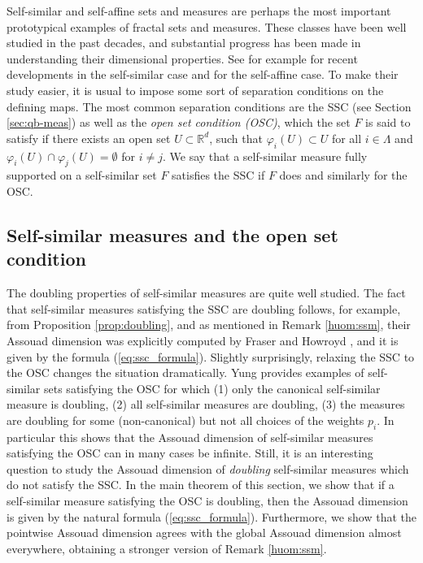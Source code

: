 \documentclass{PRM}
\newcommand{\field}[1]{\mathbb{#1}}
\newcommand{\R}{\field{R}}
\theoremstyle{plain}
\theoremstyle{definition}
\theoremstyle{remark}
\begin{document}
Self-similar and self-affine sets and measures are perhaps the most important prototypical examples of fractal sets and measures. These classes have been well studied in the past decades, and substantial progress has been made in understanding their dimensional properties. See for example \cite{Hoch} for recent developments in the self-similar case and \cite{BHR, HR} for the self-affine case. To make their study easier, it is usual to impose some sort of separation conditions on the defining maps. The most common separation conditions are the SSC (see Section \ref{sec:qb-meas}) as well as the \emph{open set condition (OSC)}, which the set $F$ is said to satisfy if there exists an open set $U\subset \R^d$, such that $\varphi_i(U)\subset U$ for all $i\in\Lambda$ and $\varphi_i(U)\cap \varphi_j(U)=\emptyset$ for $i\ne j$. We say that a self-similar measure fully supported on a self-similar set $F$ satisfies the SSC if $F$ does and similarly for the OSC.

\subsection{Self-similar measures and the open set condition}
The doubling properties of self-similar measures are quite well studied. The fact that self-similar measures satisfying the SSC are doubling follows, for example, from Proposition \ref{prop:doubling}, and as mentioned in Remark \ref{huom:ssm}, their Assouad dimension was explicitly computed by Fraser and Howroyd \cite{FH}, and it is given by the formula (\ref{eq:ssc_formula}). Slightly surprisingly, relaxing the SSC to the OSC changes the situation dramatically. Yung \cite{Yung} provides examples of self-similar sets satisfying the OSC for which (1) only the canonical self-similar measure is doubling, (2) all self-similar measures are doubling, (3) the measures are doubling for some (non-canonical) but not all choices of the weights $p_i$. In particular this shows that the Assouad dimension of self-similar measures satisfying the OSC can in many cases be infinite. Still, it is an interesting question to study the Assouad dimension of \emph{doubling} self-similar measures which do not satisfy the SSC. In the main theorem of this section, we show that if a self-similar measure satisfying the OSC is doubling, then the Assouad dimension is given by the natural formula (\ref{eq:ssc_formula}). Furthermore, we show that the pointwise Assouad dimension agrees with the global Assouad dimension almost everywhere, obtaining a stronger version of Remark \ref{huom:ssm}.
\end{document}
